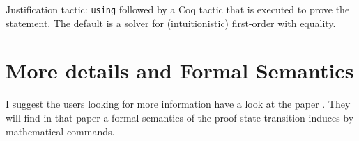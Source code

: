 Justification tactic: {\texttt{using}} followed by a Coq tactic that
is executed to prove the statement. The default is a solver for
(intuitionistic) first-{}order with equality.

\section{More details and Formal Semantics}

I suggest the users looking for more information have a look at the
paper \cite{corbineau08types}. They will find in that paper a formal
semantics of the proof state transition induces by mathematical
commands.
